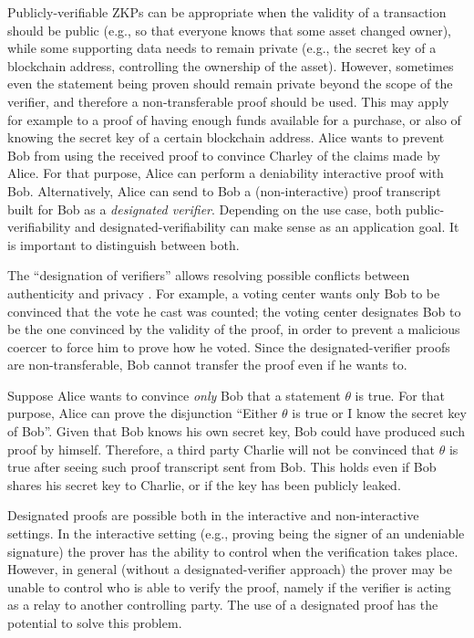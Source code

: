 	
Publicly-verifiable ZKPs can be appropriate when the validity of a transaction should be public (e.g., so that everyone knows that some asset changed owner), while some supporting data needs to remain private (e.g., the secret key of a blockchain address, controlling the ownership of the asset).
However, sometimes even the statement being proven should remain private beyond the scope of the verifier, and therefore a non-transferable proof	should be used.
This may apply for example to a proof of having enough funds available for a purchase, or also of knowing the secret key of a certain blockchain address.
Alice wants to prevent Bob from using the received proof to convince Charley of the claims made by Alice.
For that purpose, Alice can perform a deniability interactive proof with Bob.
Alternatively, Alice can send to Bob a (non-interactive) proof transcript built for Bob as a \emph{designated verifier}.
Depending on the use case, both public-verifiability and designated-verifiability can make sense as an application goal.
It is important to distinguish between both.


The ``designation of verifiers'' allows resolving possible conflicts between authenticity and privacy \cite{1996:eurocrypt:designated-verifier-proofs}.
For example, a voting center wants only Bob to be convinced that the vote he cast was counted;
the voting center designates Bob to be the one convinced by the validity of the proof, in order to prevent a malicious coercer to force him to prove how he voted.
Since the designated-verifier proofs are non-transferable, Bob cannot transfer the proof even if he wants to.


Suppose Alice wants to convince \emph{only} Bob that a statement $\theta$ is true.
For that purpose, Alice can prove the disjunction ``Either $\theta$ is true or I know the secret key of Bob''.
Given that Bob knows his own secret key, Bob could have produced such proof by himself.
Therefore, a third party Charlie will not be convinced that $\theta$ is true after seeing such proof transcript sent from Bob.
This holds even if Bob shares his secret key to Charlie, or if the key has been publicly leaked.


Designated proofs are possible both in the interactive and non-interactive settings.
In the interactive setting (e.g., proving being the signer of an undeniable signature) the prover has the ability to control when the verification takes place.
However, in general (without a designated-verifier approach) the prover may be unable to control who is able to verify the proof, namely if the verifier is acting as a relay to another controlling party.
The use of a designated proof has the potential to solve this problem.\loosen
